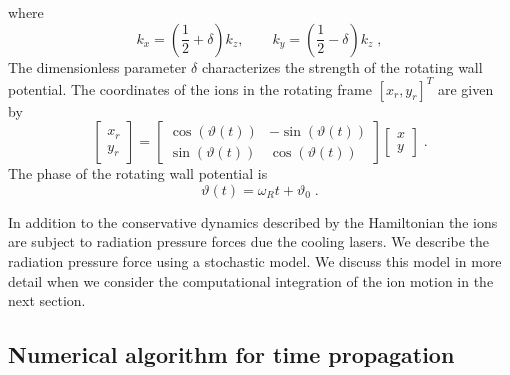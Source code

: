\documentclass[aps, pra, preprint]{revtex4-1}
\begin{document}
where
\begin{equation}
k_x=\left(\frac{1}{2}+\delta\right)k_z,\qquad 
k_y=\left(\frac{1}{2}-\delta\right)k_z\;,
\end{equation}
The dimensionless parameter $\delta$ characterizes the strength
of the rotating wall potential. The coordinates of the ions in
the rotating frame $[x_r, y_r]^T$ are given by
\begin{equation}
\left[
\begin{array}{c}
x_r\\
y_r
\end{array}\right] =
\left[
\begin{array}{cc}
\cos(\vartheta(t)) & -\sin(\vartheta(t))\\
\sin(\vartheta(t)) & \cos(\vartheta(t))
\end{array}\right]
\left[\begin{array}{c}
x\\
y
\end{array}\right]\;.
\end{equation}
The phase of the rotating wall potential is
\begin{equation}
\vartheta(t)=\omega_R t+\vartheta_0\;.
\end{equation}

In addition to the conservative dynamics described by the
Hamiltonian the ions are subject to radiation pressure forces due
the cooling lasers. We describe the radiation pressure force
using a stochastic model. We discuss this model in more detail
when we consider the computational integration of the ion motion
in the next section.


\subsection{Numerical algorithm for time propagation}
\end{document}
